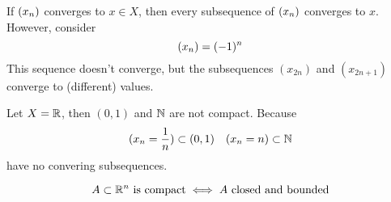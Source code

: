 \documentclass[../../script.tex]{subfiles}
\begin{document}
\begin{rem}
    If $\left(x_n\right)$ converges to $x \in X$, then every subsequence of $\left(x_n\right)$ converges to $x$. However, consider 
    \[
        \left(x_n\right) = (-1)^n
    \]
    This sequence doesn't converge, but the subsequences $(x_{2n})$ and $(x_{2n + 1})$ converge to (different) values.
\end{rem}

\begin{eg}
    Let $X = \mathbb{R}$, then $(0, 1)$ and $\mathbb{N}$ are not compact. Because
    \begin{align*}
        (x_n = \frac{1}{n}) \subset (0, 1) && (x_n = n) \subset \mathbb{N}
    \end{align*}
    have no convering subsequences.
\end{eg}

\begin{thm}
    \[
        A \subset \mathbb{R}^n \text{ is compact} \iff A \text{ closed and bounded}
    \]
\end{thm}
\end{document}
